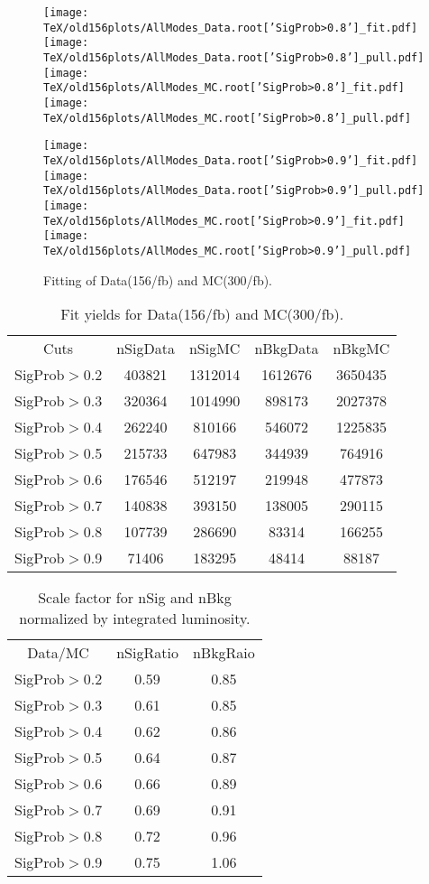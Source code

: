 \documentclass{article}
\begin{document}
\begin{figure}[h!]
\begin{center}
\texttt{[image: TeX/old156plots/AllModes\_Data.root['SigProb>0.8']\_fit.pdf]}
\texttt{[image: TeX/old156plots/AllModes\_Data.root['SigProb>0.8']\_pull.pdf]}
\texttt{[image: TeX/old156plots/AllModes\_MC.root['SigProb>0.8']\_fit.pdf]}
\texttt{[image: TeX/old156plots/AllModes\_MC.root['SigProb>0.8']\_pull.pdf]}

\texttt{[image: TeX/old156plots/AllModes\_Data.root['SigProb>0.9']\_fit.pdf]}
\texttt{[image: TeX/old156plots/AllModes\_Data.root['SigProb>0.9']\_pull.pdf]}
\texttt{[image: TeX/old156plots/AllModes\_MC.root['SigProb>0.9']\_fit.pdf]}
\texttt{[image: TeX/old156plots/AllModes\_MC.root['SigProb>0.9']\_pull.pdf]}
\caption{Fitting of Data(156/fb) and MC(300/fb).}
\label{fig:DatVsMC}
\end{center}
\end{figure}

\begin{table}[h!]
\begin{center}
\begin{tabular}{ccccc}
\hline
Cuts & nSigData & nSigMC & nBkgData & nBkgMC\\
SigProb$>$0.2 & 403821 & 1312014 & 1612676 & 3650435\\
SigProb$>$0.3 & 320364 & 1014990 & 898173 & 2027378\\
SigProb$>$0.4 & 262240 & 810166 & 546072 & 1225835\\
SigProb$>$0.5 & 215733 & 647983 & 344939 & 764916\\
SigProb$>$0.6 & 176546 & 512197 & 219948 & 477873\\
SigProb$>$0.7 & 140838 & 393150 & 138005 & 290115\\
SigProb$>$0.8 & 107739 & 286690 & 83314 & 166255\\
SigProb$>$0.9 & 71406 & 183295 & 48414 & 88187\\
\hline
\end{tabular}
\caption{Fit yields for Data(156/fb) and MC(300/fb).}
\end{center}
\end{table}

\begin{table}[h!]
\begin{center}
\begin{tabular}{ccc}
\hline
Data/MC & nSigRatio & nBkgRaio\\
SigProb$>$0.2 & 0.59 & 0.85\\
SigProb$>$0.3 & 0.61 & 0.85\\
SigProb$>$0.4 & 0.62 & 0.86\\
SigProb$>$0.5 & 0.64 & 0.87\\
SigProb$>$0.6 & 0.66 & 0.89\\
SigProb$>$0.7 & 0.69 & 0.91\\
SigProb$>$0.8 & 0.72 & 0.96\\
SigProb$>$0.9 & 0.75 & 1.06\\
\hline
\end{tabular}
\caption{Scale factor for nSig and nBkg normalized by integrated luminosity.}
\label{tab:scaled}
\end{center}
\end{table}
\end{document}
